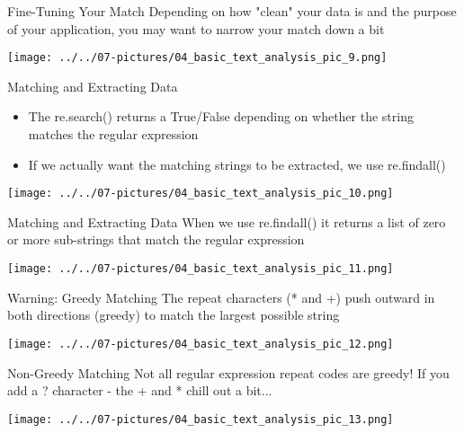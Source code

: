 \documentclass[11pt]{beamer}
\begin{document}
\begin{frame}{Fine-Tuning Your Match}
	Depending on how "clean" your data is and the purpose of your application, you may want to narrow your match down a bit
	\begin{center}
	\texttt{[image: ../../07-pictures/04\_basic\_text\_analysis\_pic\_9.png]}
	\end{center}
\end{frame}
\begin{frame}{Matching and Extracting Data}
	\begin{itemize}
		\item The re.search() returns a True/False depending on whether the string matches  the regular expression
		\item If we actually want the matching strings to be extracted, we use re.findall()
	\end{itemize}
	\begin{center}
	\texttt{[image: ../../07-pictures/04\_basic\_text\_analysis\_pic\_10.png]}
	\end{center}
\end{frame}
\begin{frame}{Matching and Extracting Data}
	When we use re.findall() it returns a list of zero or more sub-strings that match the regular expression
	\begin{center}
	\texttt{[image: ../../07-pictures/04\_basic\_text\_analysis\_pic\_11.png]}
	\end{center}
\end{frame}
\begin{frame}{Warning: Greedy Matching}
	The repeat characters (* and +) push outward in both directions (greedy) to match the largest possible string
	\begin{center}
	\texttt{[image: ../../07-pictures/04\_basic\_text\_analysis\_pic\_12.png]}
	\end{center}
\end{frame}
\begin{frame}{Non-Greedy Matching}
	Not all regular expression repeat codes are greedy!  If you add a ? character - the + and * chill out a bit...
	\begin{center}
	\texttt{[image: ../../07-pictures/04\_basic\_text\_analysis\_pic\_13.png]}
	\end{center}
\end{frame}
\end{document}
